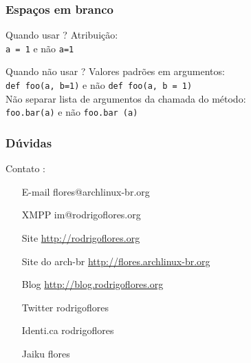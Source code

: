 \documentclass{beamer}
\begin{document}



\begin{frame}[fragile]
    \frametitle{Espaços em branco}
    \begin{block}{Quando usar ?}
        Atribuição:\\
        \verb#a = 1# e não \verb#a=1#
    \end{block}
    \begin{block}{Quando não usar ?}
        Valores padrões em argumentos:\\
        \verb#def foo(a, b=1)# e não \verb#def foo(a, b = 1)#\\
        Não separar lista de argumentos da chamada do método:\\
        \verb#foo.bar(a)# e não \verb#foo.bar (a)#
    \end{block}
\end{frame}



\begin{frame}
    \frametitle{Dúvidas}
    \begin{block}{Contato :}
        \begin{itemize}
            \centering
            \item[E-mail] flores@archlinux-br.org        
            \item[XMPP]  im@rodrigoflores.org        
            \item[Site]  \url{http://rodrigoflores.org}
            \item[Site do arch-br]  \url{http://flores.archlinux-br.org}
            \item[Blog]  \url{http://blog.rodrigoflores.org}        
            \item[Twitter] rodrigoflores        
            \item[Identi.ca] rodrigoflores        
            \item[Jaiku] flores        
        \end{itemize}
    \end{block}

\end{frame}
\end{document}
